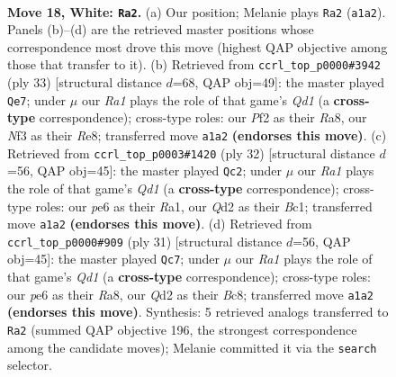 \documentclass[11pt]{article}
\begin{document}
\clearpage

\begin{figure}[p]\centering
\begin{subfigure}{0.46\textwidth}\centering
\resizebox{\linewidth}{!}{%
\newchessgame
\chessboard[
  setfen={r1br2k1/1p2qppp/2n1p3/p1Pp4/3P4/P1P2N1P/3QBPP1/R1R3K1 w - - 2 18},
  showmover=false,
  pgfstyle=straightmove, color=movearrow, markmove={a1-a2}
]}
\caption{}
\end{subfigure}\hfill
\begin{subfigure}{0.46\textwidth}\centering
\resizebox{\linewidth}{!}{%
\newchessgame
\chessboard[
  setfen={r2qr1k1/3n1pp1/bpp4p/p3p3/P3P3/2P1BN1P/1PQ2PP1/R3R1K1 b - - 1 17},
  showmover=false,
  pgfstyle=straightmove, color=movearrow, markmove={d8-e7}
]}
\caption{}
\end{subfigure}
\\[4pt]
\begin{subfigure}{0.46\textwidth}\centering
\resizebox{\linewidth}{!}{%
\newchessgame
\chessboard[
  setfen={r4bk1/1pq2p1p/2p1rnp1/p3p3/P3P3/2P2N1P/1P3PP1/R1BQR1K1 w - - 0 17},
  showmover=false,
  pgfstyle=straightmove, color=movearrow, markmove={d1-c2}
]}
\caption{}
\end{subfigure}\hfill
\begin{subfigure}{0.46\textwidth}\centering
\resizebox{\linewidth}{!}{%
\newchessgame
\chessboard[
  setfen={r1bqr1k1/1p3pp1/2p2n1p/p3p3/P3P3/2P1RNP1/1PQ2P1P/R4BK1 b - - 0 16},
  showmover=false,
  pgfstyle=straightmove, color=movearrow, markmove={d8-c7}
]}
\caption{}
\end{subfigure}
\caption{\textbf{Move 18, White: \texttt{Ra2}.} (a) Our position; Melanie plays \texttt{Ra2} (\texttt{a1a2}). Panels (b)--(d) are the retrieved master positions whose correspondence most drove this move (highest QAP objective among those that transfer to it). (b) Retrieved from \texttt{ccrl\_top\_p0000\#3942} (ply 33) [structural distance $d$=68, QAP obj=49]: the master played \texttt{Qe7}; under $\mu$ our \emph{Ra1} plays the role of that game's \emph{Qd1} (a \textbf{cross-type} correspondence); cross-type roles: our \emph{P}f2 as their \emph{R}a8, our \emph{N}f3 as their \emph{R}e8; transferred move \texttt{a1a2} \textbf{(endorses this move)}. (c) Retrieved from \texttt{ccrl\_top\_p0003\#1420} (ply 32) [structural distance $d$=56, QAP obj=45]: the master played \texttt{Qc2}; under $\mu$ our \emph{Ra1} plays the role of that game's \emph{Qd1} (a \textbf{cross-type} correspondence); cross-type roles: our \emph{p}e6 as their \emph{R}a1, our \emph{Q}d2 as their \emph{B}c1; transferred move \texttt{a1a2} \textbf{(endorses this move)}. (d) Retrieved from \texttt{ccrl\_top\_p0000\#909} (ply 31) [structural distance $d$=56, QAP obj=45]: the master played \texttt{Qc7}; under $\mu$ our \emph{Ra1} plays the role of that game's \emph{Qd1} (a \textbf{cross-type} correspondence); cross-type roles: our \emph{p}e6 as their \emph{R}a8, our \emph{Q}d2 as their \emph{B}c8; transferred move \texttt{a1a2} \textbf{(endorses this move)}. Synthesis: 5 retrieved analogs transferred to \texttt{Ra2} (summed QAP objective 196, the strongest correspondence among the candidate moves); Melanie committed it via the \texttt{search} selector.}
\label{fig:thought-m34}
\end{figure}
\end{document}
